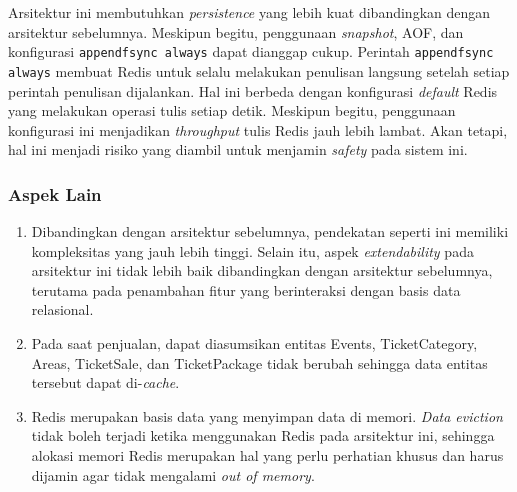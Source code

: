 Arsitektur ini membutuhkan \textit{persistence} yang lebih kuat dibandingkan dengan arsitektur sebelumnya. Meskipun begitu, penggunaan \textit{snapshot}, AOF, dan konfigurasi \texttt{appendfsync always} dapat dianggap cukup. Perintah \texttt{appendfsync always} membuat Redis untuk selalu melakukan penulisan langsung setelah setiap perintah penulisan dijalankan. Hal ini berbeda dengan konfigurasi \textit{default} Redis yang melakukan operasi tulis setiap detik. Meskipun begitu, penggunaan konfigurasi ini menjadikan \textit{throughput} tulis Redis jauh lebih lambat. Akan tetapi, hal ini menjadi risiko yang diambil untuk menjamin \textit{safety} pada sistem ini.

\subsubsection{Aspek Lain}

\begin{enumerate}
    \item Dibandingkan dengan arsitektur sebelumnya, pendekatan seperti ini memiliki kompleksitas yang jauh lebih tinggi. Selain itu, aspek \textit{extendability} pada arsitektur ini tidak lebih baik dibandingkan dengan arsitektur sebelumnya, terutama pada penambahan fitur yang berinteraksi dengan basis data relasional.
    \item Pada saat penjualan, dapat diasumsikan entitas Events, TicketCategory, Areas, TicketSale, dan TicketPackage tidak berubah sehingga data entitas tersebut dapat di-\textit{cache}.
    \item Redis merupakan basis data yang menyimpan data di memori. \textit{Data eviction} tidak boleh terjadi ketika menggunakan Redis pada arsitektur ini, sehingga alokasi memori Redis merupakan hal yang perlu perhatian khusus dan harus dijamin agar tidak mengalami \textit{out of memory}.
\end{enumerate}

